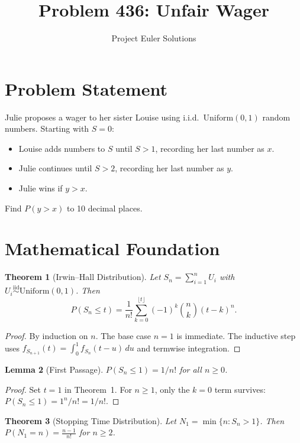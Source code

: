 \documentclass[11pt]{article}
\title{Problem 436: Unfair Wager}
\author{Project Euler Solutions}
\date{}
\newtheorem{theorem}{Theorem}
\newtheorem{lemma}[theorem]{Lemma}
\begin{document}
\maketitle

\section{Problem Statement}
Julie proposes a wager to her sister Louise using i.i.d.\ $\mathrm{Uniform}(0,1)$ random numbers. Starting with $S = 0$:
\begin{itemize}
    \item Louise adds numbers to $S$ until $S > 1$, recording her last number as $x$.
    \item Julie continues until $S > 2$, recording her last number as $y$.
    \item Julie wins if $y > x$.
\end{itemize}
Find $P(y > x)$ to 10 decimal places.

\section{Mathematical Foundation}

\begin{theorem}[Irwin--Hall Distribution]
Let $S_n = \sum_{i=1}^n U_i$ with $U_i \overset{\mathrm{iid}}{\sim} \mathrm{Uniform}(0,1)$. Then
\[
P(S_n \leq t) = \frac{1}{n!} \sum_{k=0}^{\lfloor t \rfloor} (-1)^k \binom{n}{k}(t-k)^n.
\]
\end{theorem}

\begin{proof}
By induction on $n$. The base case $n = 1$ is immediate. The inductive step uses $f_{S_{n+1}}(t) = \int_0^1 f_{S_n}(t - u)\,du$ and termwise integration.
\end{proof}

\begin{lemma}[First Passage]
$P(S_n \leq 1) = 1/n!$ for all $n \geq 0$.
\end{lemma}

\begin{proof}
Set $t = 1$ in Theorem~1. For $n \geq 1$, only the $k = 0$ term survives: $P(S_n \leq 1) = 1^n/n! = 1/n!$.
\end{proof}

\begin{theorem}[Stopping Time Distribution]
Let $N_1 = \min\{n : S_n > 1\}$. Then $P(N_1 = n) = \frac{n-1}{n!}$ for $n \geq 2$.
\end{theorem}
\end{document}
